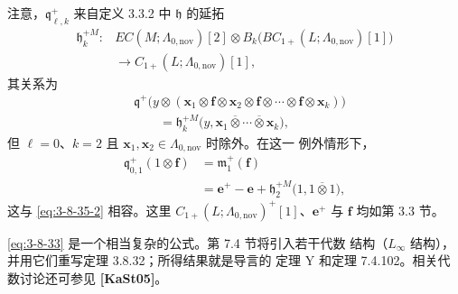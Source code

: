 注意，$\mathfrak q^+_{\ell,k}$ 来自定义 3.3.2 中 $\mathfrak h$ 的延拓
\[
\begin{aligned}
 \mathfrak h_k^{+M}\colon{}&
 EC(M;\Lambda_{0,\mathrm{nov}})[2]
 \otimes
 B_k\bigl(BC_{1+}(L;\Lambda_{0,\mathrm{nov}})[1]\bigr)\\
 &\longrightarrow C_{1+}(L;\Lambda_{0,\mathrm{nov}})[1],
\end{aligned}
\]
其关系为
\begin{equation}
\begin{aligned}
 &\mathfrak q^+\bigl(
 y\otimes(
 \mathbf x_1\otimes\mathbf f\otimes
 \mathbf x_2\otimes\mathbf f\otimes\cdots
 \otimes\mathbf f\otimes\mathbf x_k)
 \bigr)\\
 &\qquad=
 \mathfrak h_k^{+M}
 \bigl(
 y,\mathbf x_1\mathbin{\overline\otimes}\cdots
 \mathbin{\overline\otimes}\mathbf x_k
 \bigr),
\end{aligned}
\tag{3.8.35.3}\label{eq:3-8-35-3}
\end{equation}
但 $\ell=0$、$k=2$ 且
$\mathbf x_1,\mathbf x_2\in\Lambda_{0,\mathrm{nov}}$ 时除外。在这一
例外情形下，
\begin{equation}
\begin{aligned}
 \mathfrak q^+_{0,1}(1\otimes\mathbf f)
 &=\mathfrak m_1^+(\mathbf f)\\
 &=\mathbf e^+-\mathbf e
 +\mathfrak h_2^{+M}
 \bigl(1,1\mathbin{\overline\otimes}1\bigr),
\end{aligned}
\tag{3.8.35.4}\label{eq:3-8-35-4}
\end{equation}
这与 \eqref{eq:3-8-35-2} 相容。这里
$C_{1+}(L;\Lambda_{0,\mathrm{nov}})^+[1]$、$\mathbf e^+$ 与
$\mathbf f$ 均如第 3.3 节。

\eqref{eq:3-8-33} 是一个相当复杂的公式。第 7.4 节将引入若干代数
结构（$L_\infty$ 结构），并用它们重写定理 3.8.32；所得结果就是导言的
定理 Y 和定理 7.4.102。相关代数讨论还可参见
\textbf{[KaSt05]}。
